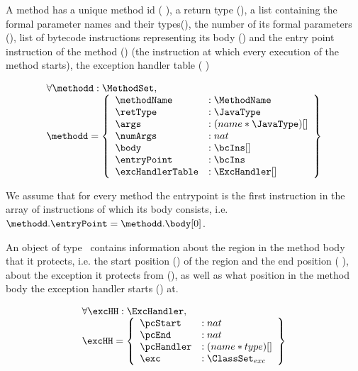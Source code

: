 
 A method has a unique method id ( \methodName), a return type (\retType),
 a list containing the formal parameter names and their types(\args), 
 the number of its formal parameters (\numArgs),
 list of bytecode instructions representing its body (\body)
 and the entry point instruction of the method (\entryPoint)
 (the instruction at which every execution of the method starts), 
 the exception handler table ( \excHandlerTable )

 $$ \begin{array}{l}  \forall \methodd: \MethodSet, \\
                     \methodd  = \left\{\begin{array}{ll}  \methodName & :\MethodName\\
						          \retType & :\JavaType\\
							  \args &  : (name * \JavaType) [] \\
							  \numArgs & : nat \\
							  \body &  : \bcIns [] \\
							  \entryPoint  &  : \bcIns\\
							  \excHandlerTable & : \ExcHandler []
                                     \end{array}  \right\}
     \end{array} $$
  
 We assume that for every method \methodd the entrypoint is the first instruction in the array of instructions 
 of which its body consists, i.e. $ \methodd.\entryPoint =\methodd.\body[0]  $.


 An object of type \ExcHandler \ contains information about the region in the method body that it protects, i.e. the start
 position (\pcStart) of the region and the end position ( \pcEnd ), about the exception it protects from (\exc),
 as well as what position in the method body the exception handler starts (\pcHandler) at.


 $$ \begin{array}{l}  \forall \excHH: \ExcHandler, \\
                     \excHH  = \left\{\begin{array}{ll} \pcStart & : nat\\
						          \pcEnd & : nat\\
							  \pcHandler &  : (name * type)[] \\
							  \exc & : \ClassSet_{exc} 
                                        \end{array}  \right\}
     \end{array} $$
 
  

